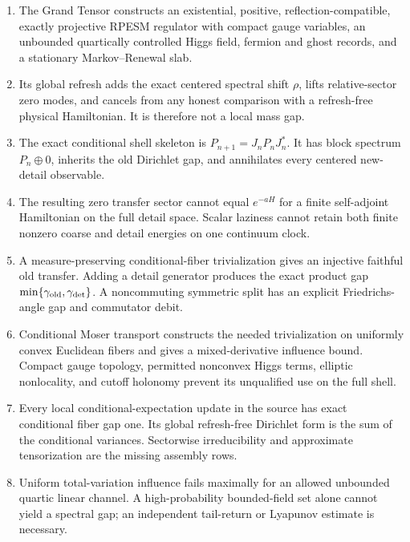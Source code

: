 \documentclass[11pt]{article}
\theoremstyle{remark}
\begin{document}
\begin{enumerate}[leftmargin=2.2em]
\item The Grand Tensor constructs an existential, positive,
      reflection-compatible, exactly projective RPESM regulator
      with compact gauge variables, an unbounded quartically
      controlled Higgs field, fermion and ghost records, and a
      stationary Markov--Renewal slab.
\item Its global refresh adds the exact centered spectral shift
      \(\rho\), lifts relative-sector zero modes, and cancels from
      any honest comparison with a refresh-free physical
      Hamiltonian.  It is therefore not a local mass gap.
\item The exact conditional shell skeleton is
      \(P_{n+1}=J_nP_nJ_n^*\).  It has block spectrum
      \(P_n\oplus0\), inherits the old Dirichlet gap, and annihilates
      every centered new-detail observable.
\item The resulting zero transfer sector cannot equal
      \(e^{-aH}\) for a finite self-adjoint Hamiltonian on the full
      detail space.  Scalar laziness cannot retain both finite
      nonzero coarse and detail energies on one continuum clock.
\item A measure-preserving conditional-fiber trivialization gives
      an injective faithful old transfer.  Adding a detail generator
      produces the exact product gap
      \(\min\{\gamma_{\rm old},\gamma_{\rm det}\}\).  A
      noncommuting symmetric split has an explicit
      Friedrichs-angle gap and commutator debit.
\item Conditional Moser transport constructs the needed
      trivialization on uniformly convex Euclidean fibers and gives
      a mixed-derivative influence bound.  Compact gauge topology,
      permitted nonconvex Higgs terms, elliptic nonlocality, and
      cutoff holonomy prevent its unqualified use on the full shell.
\item Every local conditional-expectation update in the source has
      exact conditional fiber gap one.  Its global refresh-free
      Dirichlet form is the sum of the conditional variances.
      Sectorwise irreducibility and approximate tensorization are
      the missing assembly rows.
\item Uniform total-variation influence fails maximally for an
      allowed unbounded quartic linear channel.  A high-probability
      bounded-field set alone cannot yield a spectral gap; an
      independent tail-return or Lyapunov estimate is necessary.
\end{enumerate}
\end{document}
